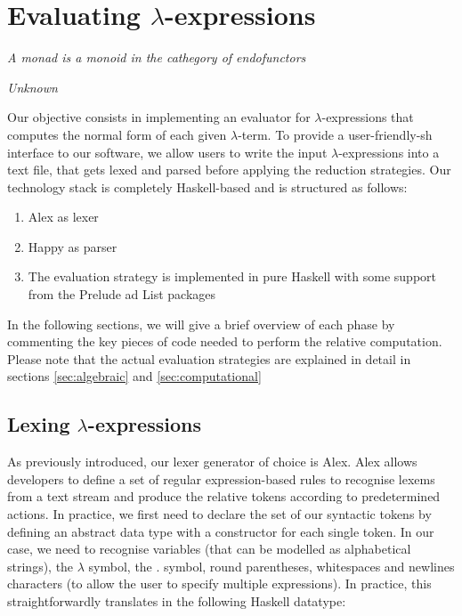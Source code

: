 \documentclass{article}
\begin{document}
\section{Evaluating $\lambda$-expressions}\label{sec:evaluation}

\epigraph{\textit{A monad is a monoid in the cathegory of endofunctors}}{\textit{Unknown}}

Our objective consists in implementing an evaluator for $\lambda$-expressions that computes the normal form of each given $\lambda$-term. To provide a user-friendly-sh interface to our software, we allow users to write the input $\lambda$-expressions into a text file, that gets lexed and parsed before applying the reduction strategies. Our technology stack is completely Haskell-based and is structured as follows:

\begin{enumerate}
    \item Alex as lexer
    \item Happy as parser
    \item The evaluation strategy is implemented in pure Haskell with some support from the Prelude ad List packages
\end{enumerate}

In the following sections, we will give a brief overview of each phase by commenting the key pieces of code needed to perform the relative computation. Please note that the actual evaluation strategies are explained in detail in sections \ref{sec:algebraic} and \ref{sec:computational}

\subsection{Lexing $\lambda$-expressions} \label{sec:lexing}

As previously introduced, our lexer generator of choice is Alex. Alex allows developers to define a set of regular expression-based rules to recognise lexems from a text stream and produce the relative tokens according to predetermined actions. In practice, we first need to declare the set of our syntactic tokens by defining an abstract data type with a constructor for each single token. In our case, we need to recognise variables (that can be modelled as alphabetical strings), the $\lambda$ symbol, the . symbol, round parentheses, whitespaces and newlines characters (to allow the user to specify multiple expressions). In practice, this straightforwardly translates in the following Haskell datatype:
\end{document}
